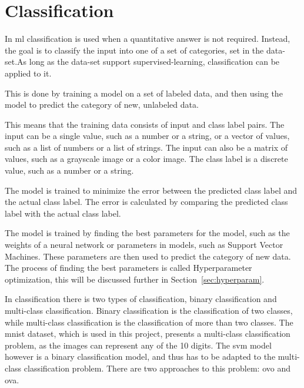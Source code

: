 \section{Classification}\label{sec:classification}
In \gls{ml} classification is used when a quantitative answer is not required. Instead, the goal is to classify the input into one of a set of categories, set in the data-set.As long as the data-set support supervised-learning, classification can be applied to it.  

This is done by training a model on a set of labeled data, and then using the model to predict the category of new, unlabeled data. 

This means that the training data consists of input and class label pairs. The input can be a single value, such as a number or a string, or a vector of values, such as a list of numbers or a list of strings. The input can also be a matrix of values, such as a grayscale image or a color image. The class label is a discrete value, such as a number or a string. 

The model is trained to minimize the error between the predicted class label and the actual class label. The error is calculated by comparing the predicted class label with the actual class label. 

The model is trained by finding the best parameters for the model, such as the weights of a neural network or parameters in models, such as Support Vector Machines. These parameters are then used to predict the category of new data. The process of finding the best parameters is called Hyperparameter optimization, this will be discussed further in Section~\ref{sec:hyperparam}.

In classification there is two types of classification, binary classification and multi-class classification. Binary classification is the classification of two classes, while multi-class classification is the classification of more than two classes. The \gls{mnist} dataset, which is used in this project, presents a multi-class classification problem, as the images can represent any of the 10 digits. The \gls{svm} model however is a binary classification model, and thus has to be adapted to the multi-class classification problem. There are two approaches to this problem: \gls{ovo} and \gls{ova}.






